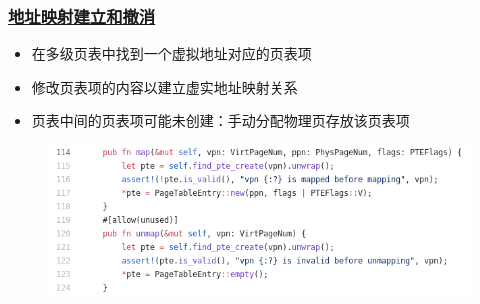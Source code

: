 \begin{frame}
    \frametitle{\href{https://rcore-os.github.io/rCore-Tutorial-Book-v3/chapter4/4sv39-implementation-2.html\#id8}{地址映射建立和撤消}}
% 
% 
        \begin{itemize}
        \item 在多级页表中找到一个虚拟地址对应的页表项
        \item 修改页表项的内容以建立虚实地址映射关系
        \item 页表中间的页表项可能未创建：手动分配物理页存放该页表项
        \end{itemize}
% 
    \begin{figure}
        \centering
        \includegraphics[width=0.8\linewidth]{figs/page_table-114.png}
    \end{figure}
% 
% 
% 
% 
\end{frame}
